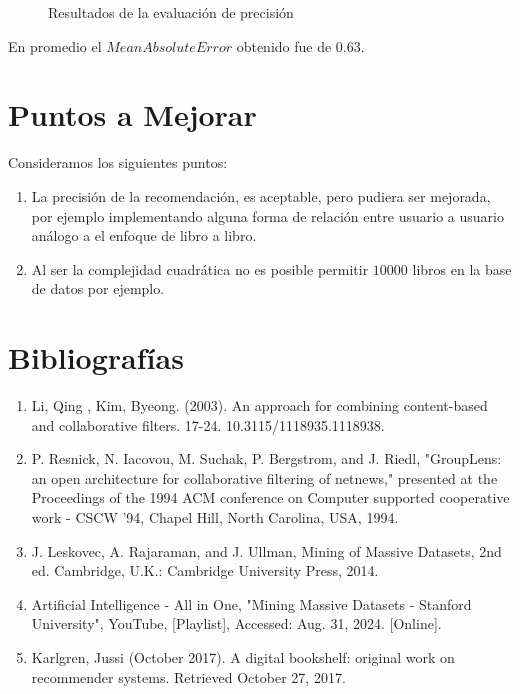 \documentclass[14pt]{extarticle}
\begin{document}
\begin{figure}[H]
    \centering
    
    \caption{Resultados de la evaluación de precisión}
    \label{fig:precision-plot}
\end{figure}

En promedio el $Mean Absolute Error$ obtenido fue de $0.63$. 

\section{Puntos a Mejorar}

Consideramos los siguientes puntos:

\begin{enumerate}
    \item La precisión de la recomendación, es aceptable, pero pudiera ser mejorada, por ejemplo implementando alguna forma de relación entre usuario a usuario análogo a el enfoque de libro a libro.
    \item Al ser la complejidad cuadrática no es posible permitir $10000$ libros en la base de datos por ejemplo.
\end{enumerate}



\section{Bibliografías}

\begin{enumerate}
    \item Li, Qing , Kim, Byeong. (2003). An approach for combining content-based and collaborative filters. 17-24. 10.3115/1118935.1118938. 
    \item P. Resnick, N. Iacovou, M. Suchak, P. Bergstrom, and J. Riedl, "GroupLens: an open architecture for collaborative filtering of netnews," presented at the Proceedings of the 1994 ACM conference on Computer supported cooperative work - CSCW '94, Chapel Hill, North Carolina, USA, 1994.
    \item J. Leskovec, A. Rajaraman, and J. Ullman, Mining of Massive Datasets, 2nd ed. Cambridge, U.K.: Cambridge University Press, 2014.
    \item Artificial Intelligence - All in One, "Mining Massive Datasets - Stanford University", YouTube, [Playlist], Accessed: Aug. 31, 2024. [Online]. 
    \item Karlgren, Jussi (October 2017). A digital bookshelf: original work on recommender systems. Retrieved October 27, 2017.
\end{enumerate}
\end{document}
